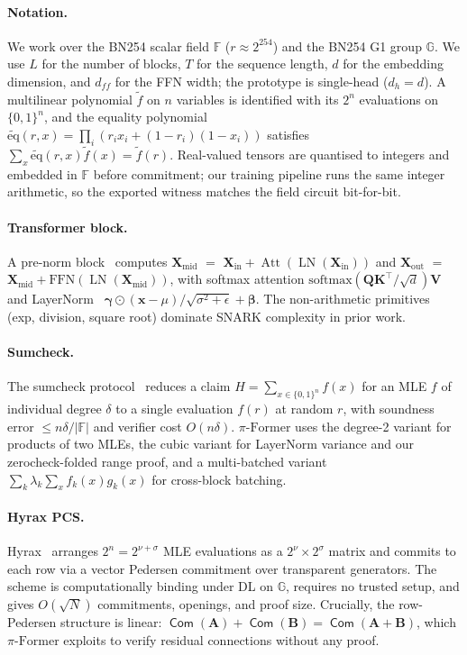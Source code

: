 \documentclass[letterpaper,twocolumn,10pt]{article}
\theoremstyle{remark}
\theoremstyle{definition}
\newcommand{\sys}{\ensuremath{\pi\text{-Former}}}
\newcommand{\FF}{\mathbb{F}}
\newcommand{\GG}{\mathbb{G}}
\newcommand{\bx}{\mathbf{x}}
\newcommand{\bA}{\mathbf{A}}
\newcommand{\bB}{\mathbf{B}}
\newcommand{\bX}{\mathbf{X}}
\newcommand{\bQ}{\mathbf{Q}}
\newcommand{\bK}{\mathbf{K}}
\newcommand{\bV}{\mathbf{V}}
\newcommand{\bbeta}{\boldsymbol{\beta}}
\newcommand{\bgamma}{\boldsymbol{\gamma}}
\newcommand{\softmax}{\mathrm{softmax}}
\newcommand{\eq}{\widetilde{\mathrm{eq}}}
\DeclareMathOperator{\LN}{LN}
\DeclareMathOperator{\Att}{Att}
\DeclareMathOperator{\Com}{\mathsf{Com}}
\begin{document}
\paragraph{Notation.}
We work over the BN254 scalar field $\FF$ ($r\!\approx\!2^{254}$) and
the BN254 G1 group $\GG$. We use $L$ for the number of blocks, $T$
for the sequence length, $d$ for the embedding dimension, and $d_{ff}$
for the FFN width; the prototype is single-head ($d_h\!=\!d$). A
multilinear polynomial $\widetilde f$ on $n$ variables is identified
with its $2^n$ evaluations on $\{0,1\}^n$, and the equality polynomial
$\eq(r,x)\!=\!\prod_i(r_i x_i+(1\!-\!r_i)(1\!-\!x_i))$ satisfies
$\sum_x\eq(r,x)\widetilde f(x)=\widetilde f(r)$. Real-valued tensors are
quantised to integers and embedded in $\FF$ before commitment; our
training pipeline runs the same integer arithmetic, so the exported
witness matches the field circuit bit-for-bit.

\paragraph{Transformer block.}
A pre-norm block~\cite{vaswani2017attention} computes
$\bX_{\mathrm{mid}}$ $=$ $\bX_{\mathrm{in}}+\Att(\LN(\bX_{\mathrm{in}}))$ and
$\bX_{\mathrm{out}}$ $=$ $\bX_{\mathrm{mid}}+\mathrm{FFN}(\LN(\bX_{\mathrm{mid}}))$,
with softmax attention $\softmax(\bQ\bK^\top\!/\sqrt d)\bV$ and
LayerNorm~\cite{ba2016layer}
$\bgamma\!\odot\!(\bx-\mu)/\sqrt{\sigma^2+\epsilon}+\bbeta$. The
non-arithmetic primitives (exp, division, square root) dominate SNARK
complexity in prior work.

\paragraph{Sumcheck.}
The sumcheck protocol~\cite{setty2020spartan,thaler2022proofs} reduces a
claim $H\!=\!\sum_{x\in\{0,1\}^n}\!f(x)$ for an MLE $f$ of individual
degree $\delta$ to a single evaluation $f(r)$ at random $r$, with
soundness error $\le n\delta/|\FF|$ and verifier cost $O(n\delta)$.
\sys{} uses the degree-2 variant for products of two MLEs, the cubic
variant for LayerNorm variance and our zerocheck-folded range proof,
and a multi-batched variant $\sum_k\lambda_k\sum_x f_k(x)g_k(x)$ for
cross-block batching.

\paragraph{Hyrax PCS.}
Hyrax~\cite{wahby2018doubly} arranges $2^n\!=\!2^{\nu+\sigma}$ MLE
evaluations as a $2^\nu\!\times\!2^\sigma$ matrix and commits to each
row via a vector Pedersen commitment over transparent generators. The
scheme is computationally binding under DL on $\GG$, requires no trusted
setup, and gives $O(\sqrt N)$ commitments, openings, and proof size.
Crucially, the row-Pedersen structure is linear:
$\Com(\bA)\!+\!\Com(\bB)\!=\!\Com(\bA\!+\!\bB)$, which \sys{} exploits to
verify residual connections without any proof.
\end{document}
